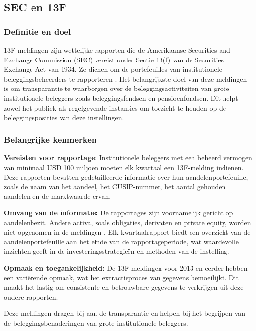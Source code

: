 \subsection{SEC en 13F}

\subsubsection{Definitie en doel}
13F-meldingen zijn wettelijke rapporten die de Amerikaanse Securities and Exchange Commission (SEC) vereist onder Sectie 13(f) van de Securities Exchange Act van 1934. Ze dienen om de portefeuilles van institutionele beleggingsbeheerders te rapporteren \textcite{SECform13F2024}. Het belangrijkste doel van deze meldingen is om transparantie te waarborgen over de beleggingsactiviteiten van grote institutionele beleggers zoals beleggingsfondsen en pensioenfondsen. Dit helpt zowel het publiek als regelgevende instanties om toezicht te houden op de beleggingsposities van deze instellingen.

\subsubsection{Belangrijke kenmerken}

\textbf{Vereisten voor rapportage:} Institutionele beleggers met een beheerd vermogen van minimaal USD 100 miljoen moeten elk kwartaal een 13F-melding indienen. Deze rapporten bevatten gedetailleerde informatie over hun aandelenportefeuille, zoals de naam van het aandeel, het CUSIP-nummer, het aantal gehouden aandelen en de marktwaarde ervan.

\textbf{Omvang van de informatie:} De rapportages zijn voornamelijk gericht op aandelenbezit. Andere activa, zoals obligaties, derivaten en private equity, worden niet opgenomen in de meldingen \textcite{SECform13F2024}. Elk kwartaalrapport biedt een overzicht van de aandelenportefeuille aan het einde van de rapportageperiode, wat waardevolle inzichten geeft in de investeringsstrategieën en methoden van de instelling.

\textbf{Opmaak en toegankelijkheid:} De 13F-meldingen voor 2013 en eerder hebben een variërende opmaak, wat het extractieproces van gegevens bemoeilijkt. Dit maakt het lastig om consistente en betrouwbare gegevens te verkrijgen uit deze oudere rapporten.

Deze meldingen dragen bij aan de transparantie en helpen bij het begrijpen van de beleggingsbenaderingen van grote institutionele beleggers.

